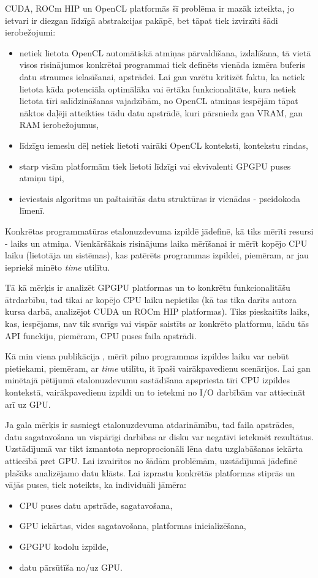 CUDA, ROCm HIP un OpenCL platformās šī problēma ir mazāk izteikta, jo ietvari
ir diezgan līdzīgā abstrakcijas pakāpē, bet tāpat tiek izvirzīti šādi
ierobežojumi:
\begin{itemize}
    \item netiek lietota OpenCL automātiskā atmiņas pārvaldīšana, izdalīšana,
        tā vietā visos risinājumos konkrētai programmai tiek definēts vienāda
        izmēra buferis datu straumes ielasīšanai, apstrādei. Lai gan varētu kritizēt
        faktu, ka netiek lietota kāda potenciāla optimālāka  vai ērtāka
        funkcionalitāte, kura netiek lietota tīri salīdzināšanas vajadzībām, no
        OpenCL atmiņas iespējām tāpat nāktos daļēji atteikties tādu datu
        apstrādē, kuri pārsniedz gan VRAM, gan RAM ierobežojumus,
    \item līdzīgu iemeslu dēļ netiek lietoti vairāki OpenCL konteksti,
        kontekstu rindas,
    \item starp visām platformām tiek lietoti līdzīgi vai ekvivalenti GPGPU
        puses atmiņu tipi,
    \item ieviestais algoritms un paštaisītās datu struktūras ir vienādas -
        pseidokoda līmenī.
\end{itemize}

Konkrētas programmatūras etalonuzdevuma izpildē jādefinē, kā tiks mērīti
resursi - laiks un atmiņa. Vienkāršākais risinājums laika mērīšanai ir mērīt
kopējo CPU laiku (lietotāja un sistēmas), kas patērēts programmas izpildei, 
piemēram, ar jau iepriekš minēto \textit{time} utilītu.

Tā kā mērķis ir analizēt GPGPU platformas un to konkrētu funkcionalitāšu
ātrdarbību, tad tikai ar kopējo CPU laiku nepietiks (kā tas tika darīts autora
kursa darbā, analizējot CUDA un ROCm HIP platformas\cite{kursa-darbs}). Tiks
pieskaitīts laiks, kas, iespējams, nav tik svarīgs vai vispār saistīts ar
konkrēto platformu, kādu tās API funckiju, piemēram, CPU puses faila apstrādi.

Kā min viena publikācija \cite{reliable-benchmarking}, mērīt pilno programmas
izpildes laiku var nebūt pietiekami, piemēram, ar \textit{time} utilītu, it
īpaši vairākpavedienu scenārijos. Lai gan minētajā pētījumā etalonuzdevumu
sastādīšana apspriesta tīri CPU izpildes kontekstā, vairākpavedienu izpildi un
to ietekmi no I/O darbībām var attiecināt arī uz GPU.

Ja gala mērķis ir sasniegt etalonuzdevuma atdarināmību, tad faila apstrādes,
datu sagatavošana un vispārīgi darbības ar disku var negatīvi ietekmēt
rezultātus. Uzstādījumā var tikt izmantota neproprocionāli lēna datu
uzglabāšanas iekārta attiecībā pret GPU. Lai izvairītos no šādām problēmām,
uzstādījumā jādefinē plašāks analizējamo datu klāsts. Lai izprastu konkrētās
platformas stiprās un vājās puses, tiek noteikts, ka individuāli jāmēra:
\begin{itemize}
    \item CPU puses datu apstrāde, sagatavošana,
    \item GPU iekārtas, vides sagatavošana, platformas inicializēšana,
    \item GPGPU kodolu izpilde,
    \item datu pārsūtīša no/uz GPU.
\end{itemize}

